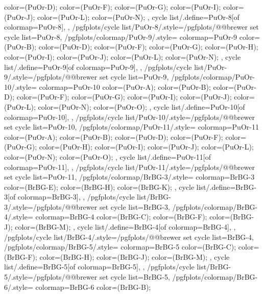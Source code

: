 {{{      color=(PuOr-D);
      color=(PuOr-F);
      color=(PuOr-G);
      color=(PuOr-I);
      color=(PuOr-J);
      color=(PuOr-L);
      color=(PuOr-N);
    },
    cycle list/.define={PuOr-8}{[of colormap=PuOr-8]},
  },
  /pgfplots/cycle list/PuOr-8/.style={/pgfplots/@@brewer set cycle list={PuOr-8}},
  /pgfplots/colormap/PuOr-9/.style={
    colormap={PuOr-9}{
      color=(PuOr-B);
      color=(PuOr-D);
      color=(PuOr-F);
      color=(PuOr-G);
      color=(PuOr-H);
      color=(PuOr-I);
      color=(PuOr-J);
      color=(PuOr-L);
      color=(PuOr-N);
    },
    cycle list/.define={PuOr-9}{[of colormap=PuOr-9]},
  },
  /pgfplots/cycle list/PuOr-9/.style={/pgfplots/@@brewer set cycle list={PuOr-9}},
  /pgfplots/colormap/PuOr-10/.style={
    colormap={PuOr-10}{
      color=(PuOr-A);
      color=(PuOr-B);
      color=(PuOr-D);
      color=(PuOr-F);
      color=(PuOr-G);
      color=(PuOr-I);
      color=(PuOr-J);
      color=(PuOr-L);
      color=(PuOr-N);
      color=(PuOr-O);
    },
    cycle list/.define={PuOr-10}{[of colormap=PuOr-10]},
  },
  /pgfplots/cycle list/PuOr-10/.style={/pgfplots/@@brewer set cycle list={PuOr-10}},
  /pgfplots/colormap/PuOr-11/.style={
    colormap={PuOr-11}{
      color=(PuOr-A);
      color=(PuOr-B);
      color=(PuOr-D);
      color=(PuOr-F);
      color=(PuOr-G);
      color=(PuOr-H);
      color=(PuOr-I);
      color=(PuOr-J);
      color=(PuOr-L);
      color=(PuOr-N);
      color=(PuOr-O);
    },
    cycle list/.define={PuOr-11}{[of colormap=PuOr-11]},
  },
  /pgfplots/cycle list/PuOr-11/.style={/pgfplots/@@brewer set cycle list={PuOr-11}},
  /pgfplots/colormap/BrBG-3/.style={
    colormap={BrBG-3}{
      color=(BrBG-E);
      color=(BrBG-H);
      color=(BrBG-K);
    },
    cycle list/.define={BrBG-3}{[of colormap=BrBG-3]},
  },
  /pgfplots/cycle list/BrBG-3/.style={/pgfplots/@@brewer set cycle list={BrBG-3}},
  /pgfplots/colormap/BrBG-4/.style={
    colormap={BrBG-4}{
      color=(BrBG-C);
      color=(BrBG-F);
      color=(BrBG-J);
      color=(BrBG-M);
    },
    cycle list/.define={BrBG-4}{[of colormap=BrBG-4]},
  },
  /pgfplots/cycle list/BrBG-4/.style={/pgfplots/@@brewer set cycle list={BrBG-4}},
  /pgfplots/colormap/BrBG-5/.style={
    colormap={BrBG-5}{
      color=(BrBG-C);
      color=(BrBG-F);
      color=(BrBG-H);
      color=(BrBG-J);
      color=(BrBG-M);
    },
    cycle list/.define={BrBG-5}{[of colormap=BrBG-5]},
  },
  /pgfplots/cycle list/BrBG-5/.style={/pgfplots/@@brewer set cycle list={BrBG-5}},
  /pgfplots/colormap/BrBG-6/.style={
    colormap={BrBG-6}{
      color=(BrBG-B);
}}}
